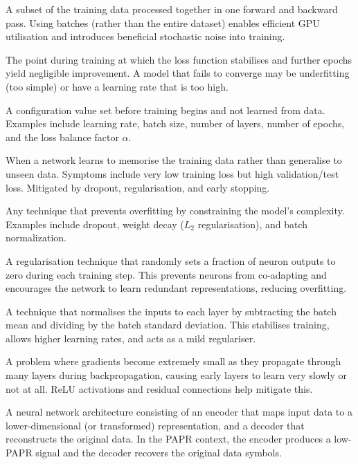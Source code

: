 \begin{description}[style=nextline, font=\normalfont\bfseries, leftmargin=1.5em]
    \item[Batch]
    A subset of the training data processed together in one forward
    and backward pass.  Using batches (rather than the entire dataset)
    enables efficient GPU utilisation and introduces beneficial
    stochastic noise into training.

    \item[Convergence]
    The point during training at which the loss function stabilises
    and further epochs yield negligible improvement.  A model that
    fails to converge may be underfitting (too simple) or have a
    learning rate that is too high.

    \item[Hyperparameter]
    A configuration value set before training begins and not learned
    from data.  Examples include learning rate, batch size, number of
    layers, number of epochs, and the loss balance factor $\alpha$.

    \item[Overfitting]
    When a network learns to memorise the training data rather than
    generalise to unseen data.  Symptoms include very low training
    loss but high validation/test loss.  Mitigated by dropout,
    regularisation, and early stopping.

    \item[Regularisation]
    Any technique that prevents overfitting by constraining the
    model's complexity.  Examples include dropout, weight decay
    ($L_2$ regularisation), and batch normalization.

    \item[Dropout]
    A regularisation technique that randomly sets a fraction of
    neuron outputs to zero during each training step.  This prevents
    neurons from co-adapting and encourages the network to learn
    redundant representations, reducing overfitting.

    \item[Batch Normalization (BatchNorm)]
    A technique that normalises the inputs to each layer by subtracting
    the batch mean and dividing by the batch standard deviation.  This
    stabilises training, allows higher learning rates, and acts as a
    mild regulariser.

    \item[Vanishing Gradients]
    A problem where gradients become extremely small as they propagate
    through many layers during backpropagation, causing early layers
    to learn very slowly or not at all.  ReLU activations and residual
    connections help mitigate this.

    \item[Autoencoder]
    A neural network architecture consisting of an encoder that maps
    input data to a lower-dimensional (or transformed) representation,
    and a decoder that reconstructs the original data.  In the PAPR
    context, the encoder produces a low-PAPR signal and the decoder
    recovers the original data symbols.

\end{description}
